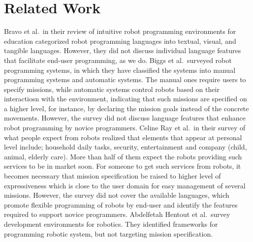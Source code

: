 \section{Related Work}

Bravo et al.\,\cite{Bravo2018} in their review of intuitive robot programming environments for education categorized robot programming languages into textual, visual, and tangible languages. However, they did not discuss individual language features that facilitate end-user programming, as we do.%
Biggs et al.\,\cite{Biggs2003} surveyed robot programming systems, in which they have classified the systems into manual programming systems and automatic systems. The manual ones require users to specify missions, while automatic systems control robots based on their interactiosn with the environment, indicating that such missions are specified on a higher level, for instance, by declaring the mission goals instead of the concrete movements. However, the survey did not discuss language features that enhance robot programming by novice programmers.
Celine Ray et al.\,\cite{CelineRayFrancescoMondadaMemberIEEEandRolandSiegwartFellow2008} in their survey of what people expect from robots realized that elements that appear at personal level include; household daily tasks, security, entertainment and company (child, animal, elderly care). More than half of them expect the robots providing such services to be in market soon. For someone to get such services from robots, it becomes necessary that mission specification be raised to higher level of expressiveness which is close to the user domain for easy management of several missions. However, the survey did not cover the available languages, which promote flexible programming of robots by end-user and identify the features required to support novice programmers.
Abdelfetah Hentout et al.\,\cite{Hentout2017} survey development environments for robotics. They identified frameworks for programming robotic system, but not targeting mission specification.


